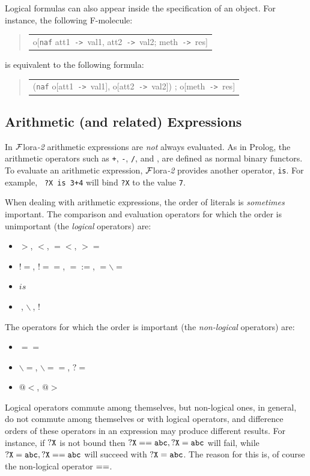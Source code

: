 \documentclass[11pt]{article}
\newenvironment{qrules}{\begin{quote}\tt\begin{tabular}[t]{l}}%
{\end{tabular}\end{quote}}
\newcommand{\mvd}{{\mbox{\tt \,->\,}}}  %
\newcommand{\FLORA}{{\mbox{\sc ${\cal F}${lora}\rm\emph{-2}}}\xspace}
\newcommand{\SILKNAF}{{{\tt naf}}\xspace}
\begin{document}
%
Logical formulas can also appear inside the specification of an object. For
instance, the following F-molecule:
\begin{qrules}
o[\SILKNAF att1{\mvd}val1, att2{\mvd}val2; meth{\mvd}res]
\end{qrules}
is equivalent to the following formula:
\begin{qrules}
(\SILKNAF o[att1{\mvd}val1], o[att2{\mvd}val2]) ; o[meth{\mvd}res]
\end{qrules}


\subsection{Arithmetic (and related) Expressions}


In \FLORA arithmetic expressions are \emph{not} always evaluated. As in
Prolog, the arithmetic operators such as {\tt +}, {\tt -}, {\tt /}, and
{\tt *}, are defined as normal binary functors. To evaluate an arithmetic
expression, \FLORA provides another operator, {\tt is}.  For example, {\tt
  ?X is 3+4} will bind {\tt ?X} to the value {\tt 7}.

When dealing with arithmetic expressions, the order of literals is
\emph{sometimes} important.
The comparison and evaluation operators for which the order is unimportant
(the \emph{logical} operators)  are:
\begin{itemize}
\item  $>$, $<$, $=<$, $>=$
\item  $!=$, $!==$, $=:=$, $=\backslash=$
\item $is$
\item $~$, $\backslash~$, $!~$
\end{itemize}
The operators for which the order is important (the \emph{non-logical}
operators) are:
\begin{itemize}
\item  $==$
\item  $\backslash=$, $\backslash==$, $?=$
\item  $@<$, $@>$
\end{itemize}
Logical operators commute among themselves, but non-logical ones, in
general, do not commute among themselves or with logical operators, and
difference orders of these operators in an expression  may produce different
results. For instance, if $\tt ?X$ is not bound then $\tt ?X == abc, ?X=abc$ will
fail, while  $\tt ?X=abc, ?X == abc$ will succeed with $\tt ?X = abc$.
The reason for this is, of course the non-logical operator $\tt ==$.
\end{document}
